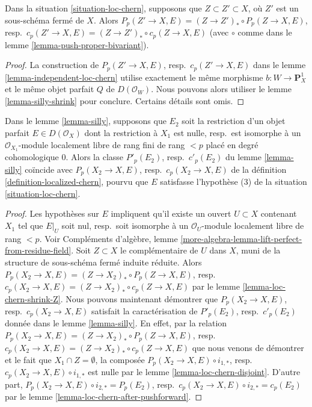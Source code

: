 \begin{lemma}
\label{lemma-loc-chern-shrink-Z}
Dans la situation \ref{situation-loc-chern},
supposons que $Z \subset Z' \subset X$, où $Z'$ est un sous-schéma fermé de $X$.
Alors
$P_p(Z' \to X, E) = (Z \to Z')_* \circ P_p(Z \to X, E)$,
resp.\ $c_p(Z' \to X, E) = (Z \to Z')_* \circ c_p(Z \to X, E)$
(avec $\circ$ comme dans le lemme \ref{lemma-push-proper-bivariant}).
\end{lemma}

\begin{proof}
La construction de $P_p(Z' \to X, E)$,
resp.\ $c_p(Z' \to X, E)$ dans le lemme \ref{lemma-independent-loc-chern}
utilise exactement le même morphisme
$b : W \to \mathbf{P}^1_X$ et le même objet parfait $Q$ de $D(\mathcal{O}_W)$.
Nous pouvons alors utiliser le lemme \ref{lemma-silly-shrink} pour conclure.
Certains détails sont omis.
\end{proof}

\begin{lemma}
\label{lemma-loc-chern-agree}
Dans le lemme \ref{lemma-silly}, supposons que $E_2$ soit la restriction d'un objet parfait
$E \in D(\mathcal{O}_X)$ dont la restriction à $X_1$ est nulle,
resp.\ est isomorphe à un $\mathcal{O}_{X_1}$-module localement libre de rang fini
de rang $< p$ placé en degré cohomologique $0$. Alors la classe
$P'_p(E_2)$, resp.\ $c'_p(E_2)$ du lemme \ref{lemma-silly} coïncide avec
$P_p(X_2 \to X, E)$, resp.\ $c_p(X_2 \to X, E)$ de la
définition \ref{definition-localized-chern}, pourvu que $E$ satisfasse
l'hypothèse (3) de la situation \ref{situation-loc-chern}.
\end{lemma}

\begin{proof}
Les hypothèses sur $E$ impliquent qu'il existe un ouvert $U \subset X$
contenant $X_1$ tel que $E|_U$ soit nul, resp.\ soit isomorphe à un
$\mathcal{O}_U$-module localement libre de rang $< p$. Voir Compléments d'algèbre, lemme
\ref{more-algebra-lemma-lift-perfect-from-residue-field}.
Soit $Z \subset X$ le complémentaire de $U$ dans $X$, muni de
la structure de sous-schéma fermé induite réduite. Alors
$P_p(X_2 \to X, E) = (Z \to X_2)_* \circ P_p(Z \to X, E)$,
resp.\ $c_p(X_2 \to X, E) = (Z \to X_2)_* \circ c_p(Z \to X, E)$
par le lemme \ref{lemma-loc-chern-shrink-Z}.
Nous pouvons maintenant démontrer que $P_p(X_2 \to X, E)$, resp.\ $c_p(X_2 \to X, E)$
satisfait la caractérisation de $P'_p(E_2)$, resp.\ $c'_p(E_2)$
donnée dans le lemme \ref{lemma-silly}. En effet, par la relation
$P_p(X_2 \to X, E) = (Z \to X_2)_* \circ P_p(Z \to X, E)$,
resp.\ $c_p(X_2 \to X, E) = (Z \to X_2)_* \circ c_p(Z \to X, E)$
que nous venons de démontrer et le fait que $X_1 \cap Z = \emptyset$,
la composée $P_p(X_2 \to X, E) \circ i_{1, *}$,
resp.\ $c_p(X_2 \to X, E) \circ i_{1, *}$ est nulle
par le lemme \ref{lemma-loc-chern-disjoint}.
D'autre part,
$P_p(X_2 \to X, E) \circ i_{2, *} = P_p(E_2)$,
resp.\ $c_p(X_2 \to X, E) \circ i_{2, *} = c_p(E_2)$
par le lemme \ref{lemma-loc-chern-after-pushforward}.
\end{proof}





